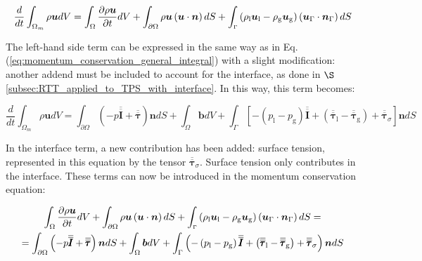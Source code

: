 \begin{equation}
\frac{d}{dt} \int_{\Omega_m} \rho \boldsymbol{u} dV =   \int_{\Omega}  \frac{\partial \rho \boldsymbol{u} }{\partial t}  dV + \int_{\partial \Omega} \rho \boldsymbol{u} \left( \boldsymbol{u} \cdot \boldsymbol{n} \right) dS + \int_\mathsmaller{\Gamma} \left( \rho_\mathrm{l} \boldsymbol{u}_\mathrm{l} - \rho_\mathrm{g} \boldsymbol{u}_\mathrm{g} \right) \left( \boldsymbol{u}_{\scriptsize{\Gamma}} \cdot \boldsymbol{n}_{\scriptsize{\Gamma}} \right) dS
\end{equation}

The left-hand side term can be expressed in the same way as in Eq. (\ref{eq:momentum_conservation_general_integral}) with a slight modification: another addend must be included to account for the interface, as done in $\S$\ref{subsec:RTT_applied_to_TPS_with_interface}. In this way, this term becomes:

\begin{equation}
\frac{d}{dt} \int_{\Omega_m} \rho \boldsymbol{u} dV =  \int_{\partial \Omega} \left( - p \overline{\overline{\pmb{I}}} + \overline{\overline{\pmb{\tau}}} \right) \boldsymbol{n} dS + \int_\Omega \boldsymbol{b} dV + \int_{\Gamma} \left[ - \left( p_\mathrm{l} - p_\mathrm{g} \right) \overline{\overline{\pmb{I}}} + \left( \overline{\overline{\pmb{\tau}}}_\mathrm{l} - \overline{\overline{\pmb{\tau}}}_\mathrm{g}  \right) + \overline{\overline{\pmb{\tau}}}_\sigma  \right] \boldsymbol{n} dS
\end{equation}

In the interface term, a new contribution has been added: surface tension, represented in this equation by the tensor $\overline{\overline{\pmb{\tau}}}_\sigma$. Surface tension only contributes in the interface. These terms can now be introduced in the momentum conservation equation:

\begin{multline}
 \int_{\Omega}  \frac{\partial \rho \boldsymbol{u} }{\partial t}  dV + \int_{\partial \Omega} \rho \boldsymbol{u} \left( \boldsymbol{u} \cdot \boldsymbol{n} \right) dS + \int_\mathsmaller{\Gamma} \left( \rho_\mathrm{l} \boldsymbol{u}_\mathrm{l} - \rho_\mathrm{g} \boldsymbol{u}_\mathrm{g} \right) \left( \boldsymbol{u}_{\scriptsize{\Gamma}} \cdot \boldsymbol{n}_{\scriptsize{\Gamma}} \right) dS = \\ = \int_{\partial \Omega} \left( - p \overline{\overline{\pmb{I}}} + \overline{\overline{\pmb{\tau}}} \right) \boldsymbol{n} dS + \int_\Omega \boldsymbol{b} dV + \int_{\Gamma} \left( - \left( p_\mathrm{l} - p_\mathrm{g} \right) \overline{\overline{\pmb{I}}} + \left( \overline{\overline{\pmb{\tau}}}_\mathrm{l} - \overline{\overline{\pmb{\tau}}}_\mathrm{g}  \right) + \overline{\overline{\pmb{\tau}}}_\sigma  \right) \boldsymbol{n} dS
\end{multline}

